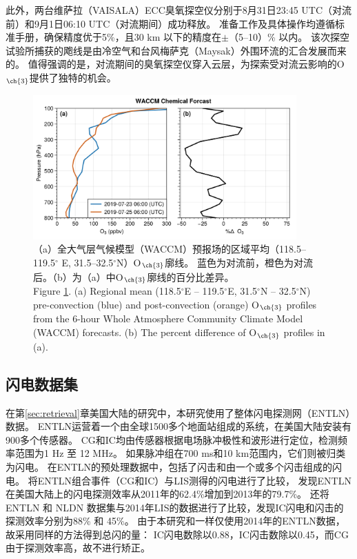此外，两台维萨拉（VAISALA）ECC臭氧探空仪分别于8月31日23:45 UTC（对流前）和9月1日06:10 UTC（对流期间）成功释放。
准备工作及具体操作均遵循标准手册，确保精度优于5\%，且30 km 以下的精度在$\pm$（5--10）\% 以内\citep{Smit.2007}。
该次探空试验所捕获的飑线是由冷空气和台风梅萨克（Maysak）外围环流的汇合发展而来的。
值得强调的是，对流期间的臭氧探空仪穿入云层，为探索受对流云影响的O$_{\ch{3}}$提供了独特的机会。

\begin{figure}[H]
\centering
\includegraphics[width=0.9\textwidth]{./figures/waccm_forcast_o3.png}
\caption{（a）全大气层气候模型（WACCM）预报场的区域平均（118.5--119.5$^{\circ}$ E, 31.5--32.5$^{\circ}$N）O$_{\ch{3}}$廓线。
蓝色为对流前，橙色为对流后。（b）为（a）中O$_{\ch{3}}$廓线的百分比差异。\\
Figure \ref{fig:waccm_forcast_o3}. (a) Regional mean (118.5$^{\circ}$E – 119.5$^{\circ}$E, 31.5$^{\circ}$N – 32.5$^{\circ}$N)
pre-convection (blue) and post-convection (orange) O$_{\ch{3}}$ profiles from the 6-hour Whole Atmosphere Community Climate Model (WACCM) forecasts.
(b) The percent difference of O$_{\ch{3}}$ profiles in (a).
}
\label{fig:waccm_forcast_o3}
\end{figure}

\subsection{闪电数据集}

在第\ref{sec:retrieval}章美国大陆的研究中，本研究使用了整体闪电探测网（ENTLN）数据。
ENTLN运营着一个由全球1500多个地面站组成的系统，在美国大陆安装有900多个传感器\citep{Zhu.2017,Marchand.2019}。
CG和IC均由传感器根据电场脉冲极性和波形进行定位，检测频率范围为1 Hz 至 12 MHz。
如果脉冲组在700 ms和10 km范围内，它们则被归类为闪电。
在ENTLN的预处理数据中，包括了闪击和由一个或多个闪击组成的闪电。
\citet{Rudlosky.2015}将ENTLN组合事件（CG和IC）与LIS测得的闪电进行了比较，
发现ENTLN在美国大陆上的闪电探测效率从2011年的62.4\%增加到2013年的79.7\%。
\citet{Lapierre.2020}还将 ENTLN 和 NLDN 数据集与2014年LIS的数据进行了比较，发现IC闪电和闪击的探测效率分别为88\% 和 45\%。
由于本研究和\citet{Lapierre.2020}一样仅使用2014年的ENTLN数据，故采用同样的方法得到总闪的量：
IC闪电数除以0.88，IC闪击数除以0.45，而CG由于探测效率高，故不进行矫正。

